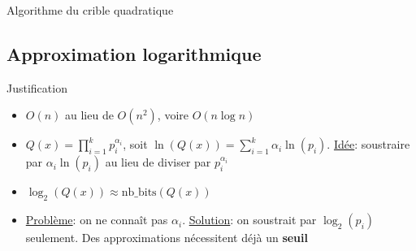 \documentclass{beamer}
\begin{document}
\begin{frame}
\begin{algorithm}[H]
    \caption{Algorithme du crible quadratique}
    \small
    \begin{algorithmic}[1]

                    \EndWhile
                \EndWhile
            \EndFor
        \EndFor
    \end{algorithmic}
    \end{algorithm}
\end{frame}

\subsection{Approximation logarithmique}

\begin{frame}{Justification}
    \begin{itemize}[<+->]
        \item $O(n)$ au lieu de $O(n^2)$, voire $O(n\log n)$
        \item $Q(x) = \prod_{i=1}^k p_i^{\alpha_i}$, soit $\ln(Q(x)) = \sum_{i=1}^k \alpha_i \ln(p_i)$.
        \newline \underline{Idée}: soustraire par $\alpha_i \ln(p_i)$ au lieu de diviser par $p_i^{\alpha_i}$
        \item $\log_2(Q(x)) \approx \text{nb\_bits}(Q(x))$
        \item \underline{Problème}: on ne connaît pas $\alpha_i$. 
        \newline \underline{Solution}: on soustrait par $\log_2(p_i)$ seulement. Des approximations nécessitent déjà un \textbf{seuil}
    \end{itemize}
\end{frame}
\end{document}
